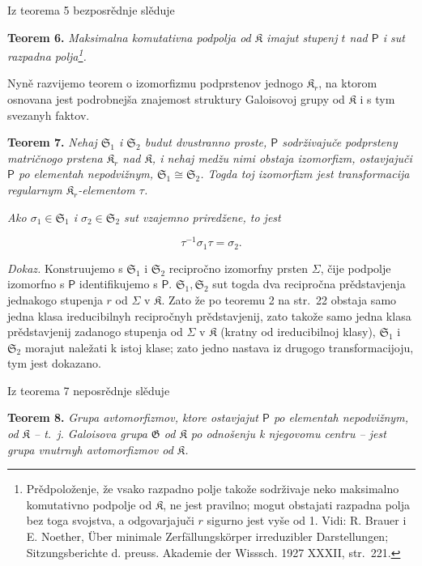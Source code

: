 \documentclass[11pt]{article}
\newcommand{\srcfn}[2]{\footnote{#2}}
\newcommand{\foreign}[1]{#1}
\begin{document}
Iz teorema 5 bezposrědnje slěduje

\textbf{Teorem 6.} \emph{Maksimalna komutativna podpolja od \(\mathfrak K\) imajut stupenj \(t\) nad \(\mathsf P\) i sut razpadna polja\srcfn{1}{Prědpoloženje, že vsako razpadno polje takože sodrživaje neko maksimalno komutativno podpolje od \(\mathfrak K\), ne jest pravilno; mogut obstajati razpadna polja bez toga svojstva, a odgovarjajuči \(r\) sigurno jest vyše od 1. Vidi: \foreign{R. Brauer} i \foreign{E. Noether}, \foreign{Über minimale Zerfällungskörper irreduzibler Darstellungen; Sitzungsberichte d. preuss. Akademie der Wisssch. 1927 XXXII, str.~221.}}.}

Nyně razvijemo teorem o izomorfizmu podprstenov jednogo \(\mathfrak K_r\), na ktorom osnovana jest podrobnejša znajemost struktury Galoisovoj grupy od \(\mathfrak K\) i s tym svezanyh faktov.

\textbf{Teorem 7.} \emph{Nehaj \(\mathfrak S_1\) i \(\mathfrak S_2\) budut dvustranno proste, \(\mathsf P\) sodrživajuče podprsteny matričnogo prstena \(\mathfrak K_r\) nad \(\mathfrak K\), i nehaj medžu nimi obstaja izomorfizm, ostavjajuči \(\mathsf P\) po elementah nepodvižnym, \(\mathfrak S_1\cong\mathfrak S_2\). Togda toj izomorfizm jest transformacija regularnym \(\mathfrak K_r\)-elementom \(\tau\).}

\emph{Ako \(\sigma_1\in\mathfrak S_1\) i \(\sigma_2\in\mathfrak S_2\) sut vzajemno priredžene, to jest}

\[
\tau^{-1}\sigma_1\tau=\sigma_2.
\]

\emph{Dokaz.} Konstruujemo s \(\mathfrak S_1\) i \(\mathfrak S_2\) recipročno izomorfny prsten \(\Sigma\), čije podpolje izomorfno s \(\mathsf P\) identifikujemo s \(\mathsf P\). \(\mathfrak S_1,\mathfrak S_2\) sut togda dva recipročna prědstavjenja jednakogo stupenja \(r\) od \(\Sigma\) v \(\mathfrak K\). Zato že po teoremu 2 na str.~22 obstaja samo jedna klasa ireducibilnyh recipročnyh prědstavjenij, zato takože samo jedna klasa prědstavjenij zadanogo stupenja od \(\Sigma\) v \(\mathfrak K\) (kratny od ireducibilnoj klasy), \(\mathfrak S_1\) i \(\mathfrak S_2\) morajut naležati k istoj klase; zato jedno nastava iz drugogo transformacijoju, tym jest dokazano.

Iz teorema 7 neposrědnje slěduje

\textbf{Teorem 8.} \emph{Grupa avtomorfizmov, ktore ostavjajut \(\mathsf P\) po elementah nepodvižnym, od \(\mathfrak K\) -- t.~j. Galoisova grupa \(\mathfrak G\) od \(\mathfrak K\) po odnošenju k njegovomu centru -- jest grupa vnutrnyh avtomorfizmov od \(\mathfrak K\).}
\end{document}
